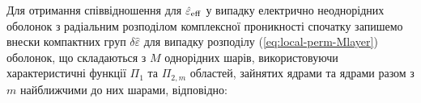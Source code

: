 \documentclass[14pt,twoside]{vakthesis}
\newcommand{\colrr}{\color{red}}
\begin{document}
Для отримання співвідношення для $\hat{\varepsilon}_{\rm eff}$ у випадку електрично неоднорідних оболонок з радіальним розподілом комплексної проникності спочатку запишемо внески компактних груп $\delta\hat{\varepsilon}$ для випадку розподілу (\ref{eq:local-perm-Mlayer}) оболонок, що складаються з $M$ однорідних  шарів, використовуючи характеристичні функції $\Pi_1$ та $\Pi_{2,m}$ областей, зайнятих ядрами та ядрами разом з $m$ найближчими до них шарами, відповідно:
\end{document}
